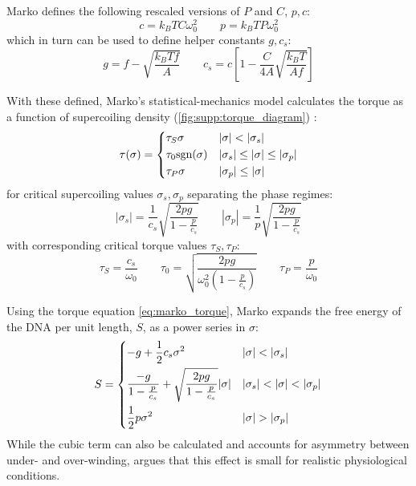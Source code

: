 \documentclass[11pt]{article} %
\begin{document}
Marko defines the following rescaled versions of \(P\) and \(C\), \(p,c\):
\[c = k_B T C \omega_0^2 \qquad p = k_B T P \omega_0^2\]
which in turn can be used to define helper constants \(g, c_s\):
\[g = f - \sqrt{\frac{k_B T f}{A}} \qquad c_s = c \left[1 - \frac{C}{4A} \sqrt{\frac{k_B T}{A f}}\right]\]

With these defined, Marko's statistical-mechanics model calculates the torque as a function of supercoiling density (\cref{fig:supp:torque_diagram}) \parencite{markoTorqueDynamicsLinking2007}:
\begin{equation}
    \tau(\sigma) = \begin{dcases} \tau_S \sigma & |\sigma| < |\sigma_s| \\ \tau_0 \text{sgn}(\sigma) & |\sigma_s| \leq |\sigma | \leq |\sigma_p| \\ \tau_P \sigma & |\sigma_p| \leq |\sigma|\end{dcases}
    \label{eq:marko_torque}
\end{equation}
for critical supercoiling values \(\sigma_s, \sigma_p\) separating the phase regimes:
\begin{equation}
    |\sigma_s| = \frac{1}{c_s} \sqrt{\frac{2pg}{1 - \frac{p}{c_s}}} \qquad |\sigma_p| = \frac{1}{p} \sqrt{\frac{2pg}{1 - \frac{p}{c_s}}}
    \label{eq:critical_sigma_values}
\end{equation}
with corresponding critical torque values \(\tau_S, \tau_P\):
\begin{equation}
    \tau_S = \frac{c_s}{\omega_0} \qquad \tau_0 = \sqrt{\frac{2 pg}{\omega_0^2 \left(1 - \frac{p}{c_s}\right)}} \qquad \tau_P = \frac{p}{\omega_0}
    \label{eq:critical_tau_values}
\end{equation}

Using the torque equation \cref{eq:marko_torque}, Marko expands the free energy of the DNA per unit length, \(S\), as a power series in \(\sigma\):
\begin{equation}
    S = \begin{dcases}
        -g + \frac{1}{2} c_s \sigma^2 & |\sigma| < |\sigma_s| \\
        \frac{-g}{1 - \frac{p}{c_s}} + \sqrt{\frac{2 p g}{1 - \frac{p}{c_s}}} |\sigma| & |\sigma_s| < |\sigma| < |\sigma_p| \\
        \frac{1}{2} p \sigma^2 & |\sigma| > |\sigma_p|
    \end{dcases}
    \label{eq:marko_energy}
\end{equation}
While the cubic term can also be calculated and accounts for asymmetry between under- and over-winding,  \textcite{markoTorqueDynamicsLinking2007} argues that this effect is small for realistic physiological conditions.
\end{document}
